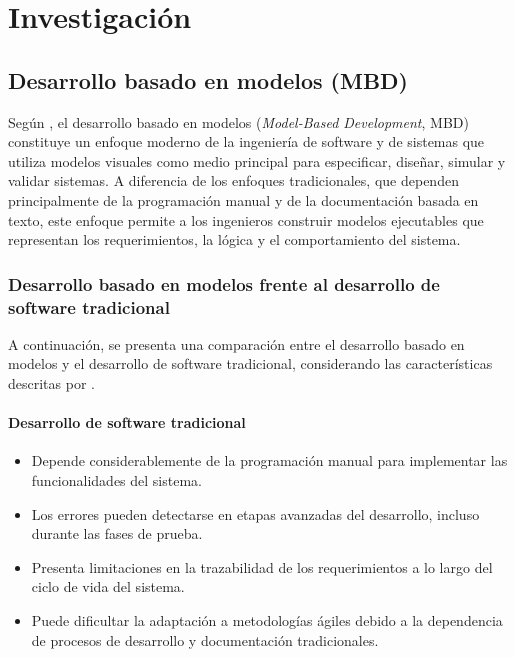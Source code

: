 \documentclass[12pt,a4paper]{article}
\begin{document}

\newpage
\section{Investigación}


\subsection{Desarrollo basado en modelos (MBD)}

Según \textcite{valera2026}, el desarrollo basado en modelos (\textit{Model-Based Development}, MBD) constituye un enfoque moderno de la ingeniería de software y de sistemas que utiliza modelos visuales como medio principal para especificar, diseñar, simular y validar sistemas. A diferencia de los enfoques tradicionales, que dependen principalmente de la programación manual y de la documentación basada en texto, este enfoque permite a los ingenieros construir modelos ejecutables que representan los requerimientos, la lógica y el comportamiento del sistema.

\subsubsection{Desarrollo basado en modelos frente al desarrollo de software tradicional}

A continuación, se presenta una comparación entre el desarrollo basado en modelos y el desarrollo de software tradicional, considerando las características descritas por \textcite{valera2026}.

\paragraph{Desarrollo de software tradicional}

\begin{itemize}
    \item Depende considerablemente de la programación manual para implementar las funcionalidades del sistema.
    \item Los errores pueden detectarse en etapas avanzadas del desarrollo, incluso durante las fases de prueba.
    \item Presenta limitaciones en la trazabilidad de los requerimientos a lo largo del ciclo de vida del sistema.
    \item Puede dificultar la adaptación a metodologías ágiles debido a la dependencia de procesos de desarrollo y documentación tradicionales.
\end{itemize}
\end{document}
